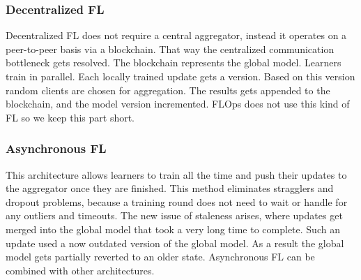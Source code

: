 \subsubsection{Decentralized FL}
Decentralized FL does not require a central aggregator, instead
it operates on a peer-to-peer basis via a blockchain.
That way the centralized communication bottleneck gets resolved.
The blockchain represents the global model.
Learners train in parallel.
Each locally trained update gets a version.
Based on this version random clients are chosen for aggregation.
The results gets appended to the blockchain, and the model version incremented.
FLOps does not use this kind of FL so we keep this part short.

\subsubsection{Asynchronous FL}
This architecture allows learners to train all the time and push
their updates to the aggregator once they are finished.
This method eliminates stragglers and dropout problems, because
a training round does not need to wait or handle for any outliers and timeouts.
The new issue of staleness arises, where updates get merged into the global model
that took a very long time to complete.
Such an update used a now outdated version of the global model.
As a result the global model gets partially reverted to an older state.
Asynchronous FL can be combined with other architectures.